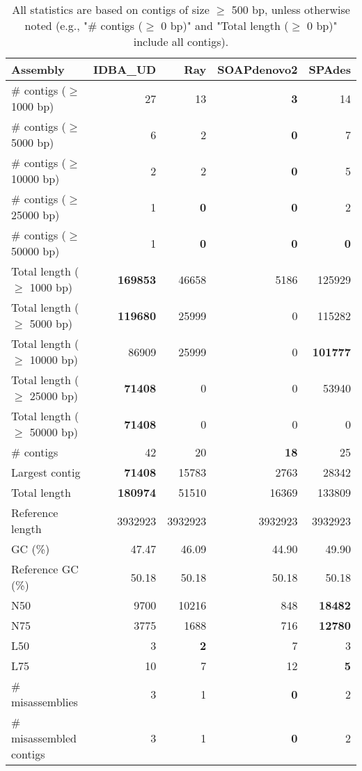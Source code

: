 \documentclass[12pt,a4paper]{article}
\begin{document}
\begin{table}[ht]
\begin{center}
\caption{All statistics are based on contigs of size $\geq$ 500 bp, unless otherwise noted (e.g., "\# contigs ($\geq$ 0 bp)" and "Total length ($\geq$ 0 bp)" include all contigs).}
\begin{tabular}{|l*{4}{|r}|}
\hline
Assembly & IDBA\_UD & Ray & SOAPdenovo2 & SPAdes \\ \hline
\# contigs ($\geq$ 1000 bp) & 27 & 13 & {\bf 3} & 14 \\ \hline
\# contigs ($\geq$ 5000 bp) & 6 & 2 & {\bf 0} & 7 \\ \hline
\# contigs ($\geq$ 10000 bp) & 2 & 2 & {\bf 0} & 5 \\ \hline
\# contigs ($\geq$ 25000 bp) & 1 & {\bf 0} & {\bf 0} & 2 \\ \hline
\# contigs ($\geq$ 50000 bp) & 1 & {\bf 0} & {\bf 0} & {\bf 0} \\ \hline
Total length ($\geq$ 1000 bp) & {\bf 169853} & 46658 & 5186 & 125929 \\ \hline
Total length ($\geq$ 5000 bp) & {\bf 119680} & 25999 & 0 & 115282 \\ \hline
Total length ($\geq$ 10000 bp) & 86909 & 25999 & 0 & {\bf 101777} \\ \hline
Total length ($\geq$ 25000 bp) & {\bf 71408} & 0 & 0 & 53940 \\ \hline
Total length ($\geq$ 50000 bp) & {\bf 71408} & 0 & 0 & 0 \\ \hline
\# contigs & 42 & 20 & {\bf 18} & 25 \\ \hline
Largest contig & {\bf 71408} & 15783 & 2763 & 28342 \\ \hline
Total length & {\bf 180974} & 51510 & 16369 & 133809 \\ \hline
Reference length & 3932923 & 3932923 & 3932923 & 3932923 \\ \hline
GC (\%) & 47.47 & 46.09 & 44.90 & 49.90 \\ \hline
Reference GC (\%) & 50.18 & 50.18 & 50.18 & 50.18 \\ \hline
N50 & 9700 & 10216 & 848 & {\bf 18482} \\ \hline
N75 & 3775 & 1688 & 716 & {\bf 12780} \\ \hline
L50 & 3 & {\bf 2} & 7 & 3 \\ \hline
L75 & 10 & 7 & 12 & {\bf 5} \\ \hline
\# misassemblies & 3 & 1 & {\bf 0} & 2 \\ \hline
\# misassembled contigs & 3 & 1 & {\bf 0} & 2 \\ \hline

\end{tabular}
\end{center}
\end{table}
\end{document}
